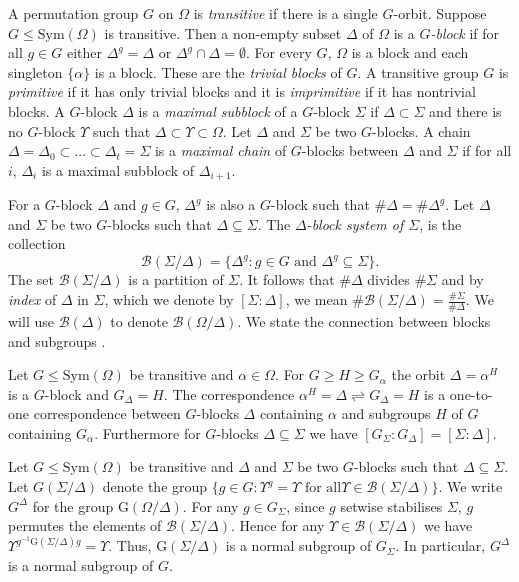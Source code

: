 \documentclass{llncs}
\newcommand{\Blocks}[1]{{\ensuremath{\mathcal{B}\left(#1\right)}}}
\newcommand{\Gof}[1]{{\ensuremath{\mathrm{G}\left(#1\right)}}}
\newcommand{\Sym}[1]{{\ensuremath{\mathrm{Sym}\left(#1\right)}}}
\begin{document}
A permutation group $G$ on $\Omega$ is \emph{transitive} if there is a
single $G$-orbit. Suppose $G \leq \Sym{\Omega}$ is transitive.  Then a
non-empty subset $\Delta$ of $\Omega$ is a \emph{$G$-block} if for all
$g \in G$ either $\Delta^g = \Delta$ or $\Delta^g \cap
\Delta=\emptyset$.  For every $G$, $\Omega$ is a block and each
singleton $\{\alpha\}$ is a block. These are the \emph{trivial blocks}
of $G$. A transitive group $G$ is \emph{primitive} if it has only
trivial blocks and it is \emph{imprimitive} if it has nontrivial
blocks. A $G$-block $\Delta$ is a \emph{maximal subblock} of a
$G$-block $\Sigma$ if $\Delta \subset \Sigma$ and there is no
$G$-block $\Upsilon$ such that $\Delta \subset \Upsilon \subset
\Omega$. Let $\Delta$ and $\Sigma$ be two $G$-blocks. A chain $\Delta
= \Delta_0 \subset \ldots \subset \Delta_t = \Sigma$ is a
\emph{maximal chain} of $G$-blocks between $\Delta$ and $\Sigma$ if
for all $i$, $\Delta_i$ is a maximal subblock of $\Delta_{i+1}$.

For a $G$-block $\Delta$ and $g \in G$, $\Delta^g$ is also a $G$-block
such that $\# \Delta = \# \Delta^g$. Let $\Delta$ and $\Sigma$ be two
$G$-blocks such that $\Delta \subseteq \Sigma$.  The
\emph{$\Delta$-block system of $\Sigma$}, is the collection
\[
\Blocks{\Sigma/\Delta} = \{ \Delta^g : g \in G \textrm{ and } \Delta^g
\subseteq \Sigma \}.
\] 
The set $\Blocks{\Sigma/\Delta}$ is a partition of $\Sigma$.  It
follows that $\# \Delta$ divides $\# \Sigma$ and by \emph{index} of
$\Delta$ in $\Sigma$, which we denote by $[\Sigma:\Delta]$, we mean
$\# \Blocks{\Sigma/\Delta} = \frac{\# \Sigma}{\# \Delta}$. We will use
$\Blocks{\Delta}$ to denote $\Blocks{\Omega/\Delta}$. We state the
connection between blocks and subgroups \cite[Theorem
7.5]{wielandt64finite}.

\begin{theorem}\label{thm-blocks-galois}
  Let $G\leq\Sym{\Omega}$ be transitive and $\alpha\in\Omega$. For $G
  \geq H \geq G_\alpha$ the orbit $\Delta = \alpha^H$ is a $G$-block
  and $G_\Delta = H$. The correspondence $\alpha^H = \Delta
  \rightleftharpoons G_\Delta = H$ is a one-to-one correspondence
  between $G$-blocks $\Delta$ containing $\alpha$ and subgroups $H$ of
  $G$ containing $G_\alpha$. Furthermore for $G$-blocks $\Delta
  \subseteq \Sigma$ we have $[G_\Sigma : G_\Delta] = [\Sigma :
  \Delta]$.
\end{theorem}

Let $G\leq\Sym{\Omega}$ be transitive and $\Delta$ and $\Sigma$ be two
$G$-blocks such that $\Delta\subseteq \Sigma$. Let $G(\Sigma/\Delta)$
denote the group $\{ g \in G : \Upsilon^g = \Upsilon \textrm{ for all
} \Upsilon \in \Blocks{\Sigma/\Delta} \}$.  We write $G^\Delta$ for
the group $\Gof{\Omega/\Delta}$.  For any $g \in G_\Sigma$, since $g$
setwise stabilises $\Sigma$, $g$ permutes the elements of
$\Blocks{\Sigma/\Delta}$. Hence for any $\Upsilon \in
\Blocks{\Sigma/\Delta}$ we have $\Upsilon^{g^{-1}\Gof{\Sigma/\Delta}g}
= \Upsilon$. Thus, $\Gof{\Sigma/\Delta}$ is a normal subgroup of
$G_\Sigma$.  In particular, $G^\Delta$ is a normal subgroup of $G$.
\end{document}

